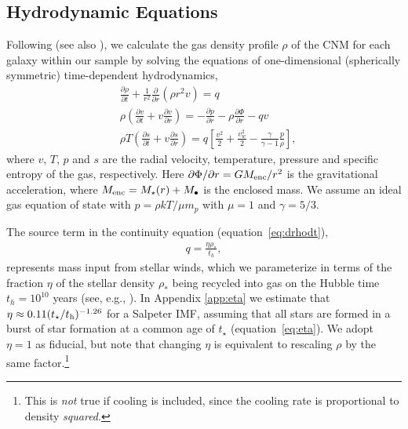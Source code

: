\documentclass[usenatbib,fleqn]{mn2e}
\newcommand{\dxdy}[2]{\frac{\partial #1}{\partial #2} }
\newcommand{\drhodt}{\dxdy{\rho}{t}}
\newcommand{\dpdr}{\dxdy{p}{r}}
\newcommand{\dphidr}{\dxdy{\Phi}{r}}
\newcommand{\ke}{\frac{v^2}{2}}
\newcommand{\kew}{\frac{v_w^2}{2}}
\newcommand{\gammaf}{\frac{\gamma}{\gamma-1}}
\newcommand{\cs}{\frac{p}{\rho}}
\newcommand{\rhostar}{\rho_*}
\newcommand{\Mbh}[1][]{M_{\bullet#1}}
\renewcommand{\th}{t_h}
\begin{document}


\subsection{Hydrodynamic Equations}
\label{sec:hydro}

Following \citet{Quataert:2004a} (see also \citealt{HolzerAxford:1970a,De-ColleGuillochon+:2012a,ShcherbakovWong+:2014a}), we calculate the gas density profile $\rho$ of the CNM for each galaxy within our sample by solving the equations of one-dimensional (spherically symmetric) time-dependent hydrodynamics,
\begin{align}
  &\drhodt+\frac{1}{r^2}\frac{\partial}{\partial r}\left(\rho r^2 v\right)=q \label{eq:drhodt}\\
  &\rho \left(\frac{\partial v}{\partial t} + v\frac{\partial v}{\partial r}\right) =-\dpdr-\rho \dphidr-q v \label{eq:dvdt}\\
  &\rho T\left(\frac{\partial s}{\partial t} + v\frac{\partial
      s}{\partial r}\right)=q\left[\ke+\kew-\gammaf \cs \right] 
, 
\label{eq:dsdt}
\end{align}
where $v$, $T$, $p$ and $s$ are the radial velocity, temperature,
pressure and specific entropy of the gas, respectively.  Here $\partial
\Phi/\partial r = GM_{\rm enc}/r^{2}$ is the gravitational
acceleration, where $M_{\rm enc} = M_{\star}(r) + \Mbh$ is the
enclosed mass.  We assume an ideal gas equation of state with $p =
\rho kT/\mu m_p$ with $\mu = 1$  and $\gamma = 5/3$.  

The source term in the continuity equation (equation~\ref{eq:drhodt}),
\begin{align}
  q=\frac{\eta \rhostar}{\th},
\label{eq:q}
\end{align}
represents mass input from stellar winds, which we parameterize in
terms of the fraction $\eta$ of the stellar density $\rhostar$ being
recycled into gas on the Hubble time $\th = 10^{10}$ years (see, e.g.,
\citealt{Ciotti+91}).  In Appendix \ref{app:eta} we estimate that
$\eta \approx 0.11(t_{\star}/t_{\rm h})^{-1.26}$ for a Salpeter IMF,
assuming that all stars are formed in a burst of star formation at a
common age of $t_{\star}$ (equation~\ref{eq:eta}).  We adopt
$\eta=1$ as fiducial, but note that changing $\eta$ is equivalent to
rescaling $\rho$ by the same factor.\footnote{This is {\it not} true
  if cooling is included, since the cooling rate is proportional to
  density {\it squared}.}
\end{document}
